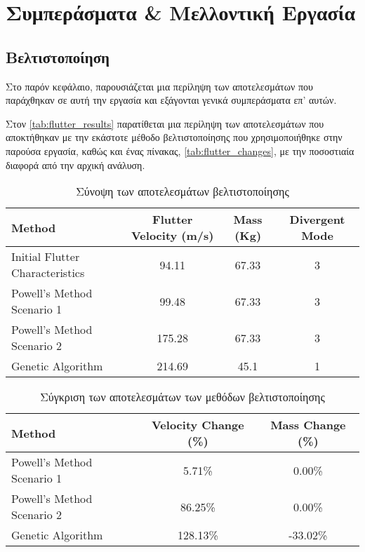 \chapter{Συμπεράσματα \& Μελλοντική Εργασία}
\label{conclusions-future-work}

\section{Βελτιστοποίηση}\label{optimization}

Στο παρόν κεφάλαιο, παρουσιάζεται μια περίληψη των αποτελεσμάτων που παράχθηκαν σε αυτή την εργασία και εξάγονται γενικά συμπεράσματα επ' αυτών.

Στον \autoref{tab:flutter_results} παρατίθεται μια περίληψη των αποτελεσμάτων που αποκτήθηκαν με την εκάστοτε μέθοδο βελτιστοποίησης που χρησιμοποιήθηκε στην παρούσα εργασία, καθώς και ένας πίνακας, \autoref{tab:flutter_changes}, με την ποσοστιαία διαφορά από την αρχική ανάλυση.

\begin{table}[h]
  \footnotesize
  \centering
  \setlength{\tabcolsep}{5pt}
  \renewcommand{\arraystretch}{1.2}
  \begin{tabularx}{\textwidth}{lccc}
      \toprule
      \textbf{Method} & \textbf{Flutter Velocity (m/s)} & \textbf{Mass (Kg)} & \textbf{Divergent Mode} \\
      \midrule
      Initial Flutter Characteristics & 94.11 & 67.33 & 3 \\
      Powell’s Method Scenario 1 & 99.48 & 67.33 & 3 \\
      Powell’s Method Scenario 2 & 175.28 & 67.33 & 3 \\
      Genetic Algorithm & 214.69 & 45.1 & 1 \\
      \bottomrule
  \end{tabularx}
  \caption{\textgreek{Σύνοψη των αποτελεσμάτων βελτιστοποίησης}}
  \label{tab:flutter_results}
\end{table}

\begin{table}[h]
  \centering
  \footnotesize
  \setlength{\tabcolsep}{5pt}
  \renewcommand{\arraystretch}{1.2}
  \begin{tabular}{lcc}
      \toprule
      \textbf{Method} & \textbf{Velocity Change (\%)} & \textbf{Mass Change (\%)} \\
      \midrule
      Powell’s Method Scenario 1 & 5.71\% & 0.00\% \\
      Powell’s Method Scenario 2 & 86.25\% & 0.00\% \\
      Genetic Algorithm & 128.13\% & -33.02\% \\
      \bottomrule
  \end{tabular}
  \caption{\textgreek{Σύγκριση των αποτελεσμάτων των μεθόδων βελτιστοποίησης}}
  \label{tab:flutter_changes}
\end{table}

